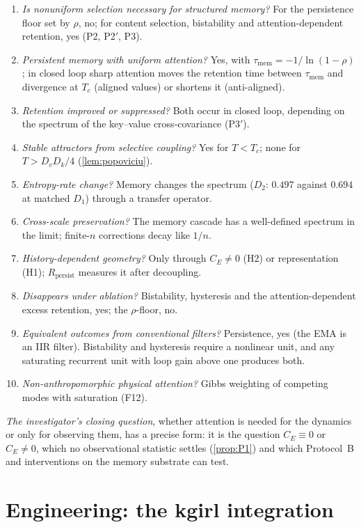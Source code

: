 \documentclass[11pt]{article}
\theoremstyle{definition}
\theoremstyle{remark}
\begin{document}
\begin{enumerate}[label=\arabic*.]
\item \emph{Is nonuniform selection necessary for structured memory?} For the persistence floor set by $\rho$, no; for content selection, bistability and attention-dependent retention, yes (P2, P2$'$, P3).
\item \emph{Persistent memory with uniform attention?} Yes, with $\tau_{\mathrm{mem}}=-1/\ln(1-\rho)$; in closed loop sharp attention moves the retention time between $\tau_{\mathrm{mem}}$ and divergence at $T_c$ (aligned values) or shortens it (anti-aligned).
\item \emph{Retention improved or suppressed?} Both occur in closed loop, depending on the spectrum of the key--value cross-covariance (P3$'$).
\item \emph{Stable attractors from selective coupling?} Yes for $T<T_c$; none for $T>D_vD_k/4$ (\cref{lem:popoviciu}).
\item \emph{Entropy-rate change?} Memory changes the spectrum ($D_2$: $0.497$ against $0.694$ at matched $D_1$) through a transfer operator.
\item \emph{Cross-scale preservation?} The memory cascade has a well-defined spectrum in the limit; finite-$n$ corrections decay like $1/n$.
\item \emph{History-dependent geometry?} Only through $C_E\ne0$ (H2) or representation (H1); $R_{\mathrm{persist}}$ measures it after decoupling.
\item \emph{Disappears under ablation?} Bistability, hysteresis and the attention-dependent excess retention, yes; the $\rho$-floor, no.
\item \emph{Equivalent outcomes from conventional filters?} Persistence, yes (the EMA is an IIR filter). Bistability and hysteresis require a nonlinear unit, and any saturating recurrent unit with loop gain above one produces both.
\item \emph{Non-anthropomorphic physical attention?} Gibbs weighting of competing modes with saturation (F12).
\end{enumerate}
\emph{The investigator's closing question}, whether attention is needed for the dynamics or only for observing them, has a precise form: it is the question $C_E\equiv0$ or $C_E\ne0$, which no observational statistic settles (\cref{prop:P1}) and which Protocol~B and interventions on the memory substrate can test.

\section{Engineering: the kgirl integration}
\end{document}
